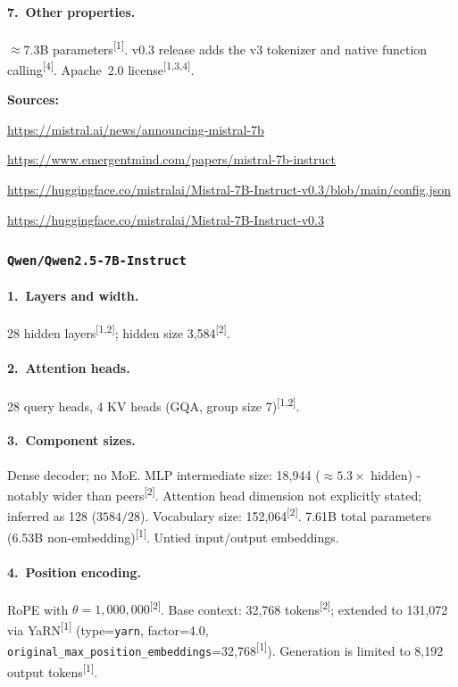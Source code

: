\documentclass[11pt, a4paper]{article}
\newcommand{\src}[1]{\textsuperscript{\normalfont\small[#1]}}
\begin{document}
\paragraph{7.~Other properties.}
$\approx$7.3B parameters\src{1}.
v0.3 release adds the v3 tokenizer and native function calling\src{4}.
Apache~2.0 license\src{1,3,4}.

\noindent\textbf{Sources:}
\begin{enumerate}[noitemsep,label=\small{[\arabic*]},leftmargin=*,topsep=2pt]
\item \small\url{https://mistral.ai/news/announcing-mistral-7b}
\item \small\url{https://www.emergentmind.com/papers/mistral-7b-instruct}
\item \small\url{https://huggingface.co/mistralai/Mistral-7B-Instruct-v0.3/blob/main/config.json}
\item \small\url{https://huggingface.co/mistralai/Mistral-7B-Instruct-v0.3}
\end{enumerate}

\subsubsection{\texttt{Qwen/Qwen2.5-7B-Instruct}}

\paragraph{1.~Layers and width.}
28 hidden layers\src{1,2}; hidden size 3,584\src{2}.

\paragraph{2.~Attention heads.}
28 query heads, 4 KV heads (GQA, group size 7)\src{1,2}.

\paragraph{3.~Component sizes.}
Dense decoder; no MoE.
MLP intermediate size: 18,944 ($\approx5.3\times$ hidden) - notably wider than
peers\src{2}.
Attention head dimension not explicitly stated; inferred as 128 ($3584/28$).
Vocabulary size: 152,064\src{2}.
7.61B total parameters (6.53B non-embedding)\src{1}.
Untied input/output embeddings.

\paragraph{4.~Position encoding.}
RoPE with $\theta=1{,}000{,}000$\src{2}.
Base context: 32,768 tokens\src{2}; extended to 131,072 via
YaRN\src{1} (type=\texttt{yarn}, factor=4.0,
\texttt{original\_max\_position\_embeddings}=32,768\src{1}).
Generation is limited to 8,192 output tokens\src{1}.
\end{document}
